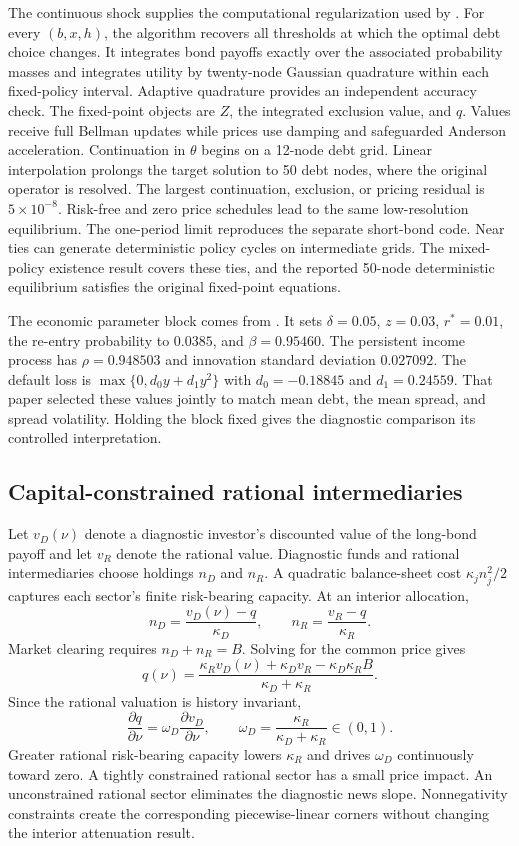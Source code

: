 \documentclass[11pt]{article}
\theoremstyle{definition}
\providecommand{\LongFPResidual}{$5\times10^{-8}$}
\begin{document}
The continuous shock supplies the computational regularization used by \citet{ChatterjeeEyigungor2012}. For every $(b,x,h)$, the algorithm recovers all thresholds at which the optimal debt choice changes. It integrates bond payoffs exactly over the associated probability masses and integrates utility by twenty-node Gaussian quadrature within each fixed-policy interval. Adaptive quadrature provides an independent accuracy check. The fixed-point objects are $Z$, the integrated exclusion value, and $q$. Values receive full Bellman updates while prices use damping and safeguarded Anderson acceleration. Continuation in $\theta$ begins on a 12-node debt grid. Linear interpolation prolongs the target solution to 50 debt nodes, where the original operator is resolved. The largest continuation, exclusion, or pricing residual is \LongFPResidual. Risk-free and zero price schedules lead to the same low-resolution equilibrium. The one-period limit reproduces the separate short-bond code. Near ties can generate deterministic policy cycles on intermediate grids. The mixed-policy existence result covers these ties, and the reported 50-node deterministic equilibrium satisfies the original fixed-point equations.

The economic parameter block comes from \citet{ChatterjeeEyigungor2012}. It sets $\delta=0.05$, $z=0.03$, $r^*=0.01$, the re-entry probability to $0.0385$, and $\beta=0.95460$. The persistent income process has $\rho=0.948503$ and innovation standard deviation $0.027092$. The default loss is $\max\{0,d_0y+d_1y^2\}$ with $d_0=-0.18845$ and $d_1=0.24559$. That paper selected these values jointly to match mean debt, the mean spread, and spread volatility. Holding the block fixed gives the diagnostic comparison its controlled interpretation.

\subsection{Capital-constrained rational intermediaries}\label{app:intermediaries}

Let $v_D(\nu)$ denote a diagnostic investor's discounted value of the long-bond payoff and let $v_R$ denote the rational value. Diagnostic funds and rational intermediaries choose holdings $n_D$ and $n_R$. A quadratic balance-sheet cost $\kappa_j n_j^2/2$ captures each sector's finite risk-bearing capacity. At an interior allocation,
\[
n_D=\frac{v_D(\nu)-q}{\kappa_D},
\qquad
n_R=\frac{v_R-q}{\kappa_R}.
\]
Market clearing requires $n_D+n_R=B$. Solving for the common price gives
\[
q(\nu)=
\frac{\kappa_Rv_D(\nu)+\kappa_Dv_R-\kappa_D\kappa_RB}
{\kappa_D+\kappa_R}.
\]
Since the rational valuation is history invariant,
\[
\frac{\partial q}{\partial \nu}
=\omega_D\frac{\partial v_D}{\partial \nu},
\qquad
\omega_D=\frac{\kappa_R}{\kappa_D+\kappa_R}\in(0,1).
\]
Greater rational risk-bearing capacity lowers $\kappa_R$ and drives $\omega_D$ continuously toward zero. A tightly constrained rational sector has a small price impact. An unconstrained rational sector eliminates the diagnostic news slope. Nonnegativity constraints create the corresponding piecewise-linear corners without changing the interior attenuation result.
\end{document}
